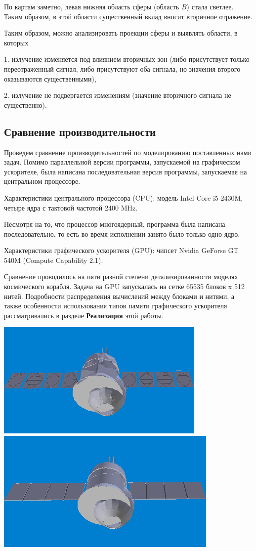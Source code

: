 По картам заметно, левая нижняя область сферы (область $B$) стала светлее. Таким образом, в этой области существенный вклад вносит вторичное отражение. 

Таким образом, можно анализировать проекции сферы и выявлять области, в которых

1. излучение изменяется под влиянием вторичных зон (либо присутствует только переотраженный сигнал, либо присутствуют оба сигнала, но значения второго оказываются существенными),

2. излучение не подвергается изменениям (значение вторичного сигнала не существенно).

\subsection*{Сравнение производительности}

Проведем сравнение производительностей по моделированию поставленных нами задач. Помимо параллельной версии программы, запускаемой на графическом ускорителе, была написана последовательная версия программы, запускаемая на центральном процессоре.  

Характеристики центрального процессора (CPU): модель Intel Core i5 2430M, четыре ядра с тактовой частотой 2400 MHz. 

Несмотря на то, что процессор многоядерный, программа была написана последовательно, то есть во время исполнении занято было только одно ядро.

Характеристики графического ускорителя (GPU): чипсет Nvidia GeForse GT 540M (Compute Capability 2.1).

Сравнение проводилось на пяти разной степени детализированности моделях космического корабля. Задача на GPU запускалась на сетке 65535 блоков x 512 нитей. Подробности распределения вычислений между блоками и нитями, а также особенности использования типов памяти графического ускорителя рассматривались в разделе \textbf{Реализация} этой работы.

\begin{center}
\includegraphics[width=0.492\linewidth]{soyz-detalisation-low.png}
\includegraphics[width=0.4987\linewidth]{soyz-detalisation-full.png}
\end{center}

